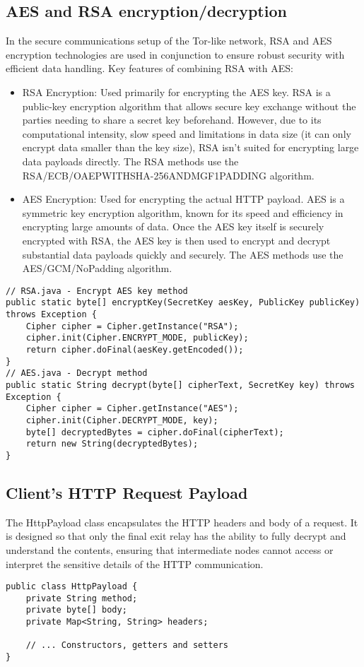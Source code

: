 \documentclass[sigconf]{acmart}
\begin{document}
\subsection{AES and RSA encryption/decryption}
In the secure communications setup of the Tor-like network, RSA and AES encryption technologies are used in conjunction to ensure robust security with efficient data handling.
Key features of combining RSA with AES:
\begin{itemize}
    \item RSA Encryption: Used primarily for encrypting the AES key. RSA is a public-key encryption algorithm that allows secure key exchange without the parties needing to share a secret key beforehand. However, due to its computational intensity, slow speed and limitations in data size (it can only encrypt data smaller than the key size), RSA isn't suited for encrypting large data payloads directly. The RSA methods use the RSA/ECB/OAEPWITHSHA-256ANDMGF1PADDING algorithm.
    \item AES Encryption: Used for encrypting the actual HTTP payload. AES is a symmetric key encryption algorithm, known for its speed and efficiency in encrypting large amounts of data. Once the AES key itself is securely encrypted with RSA, the AES key is then used to encrypt and decrypt substantial data payloads quickly and securely. The AES methods use the AES/GCM/NoPadding algorithm.
\end{itemize}

\begin{lstlisting}
// RSA.java - Encrypt AES key method
public static byte[] encryptKey(SecretKey aesKey, PublicKey publicKey) throws Exception {
    Cipher cipher = Cipher.getInstance("RSA");
    cipher.init(Cipher.ENCRYPT_MODE, publicKey);
    return cipher.doFinal(aesKey.getEncoded());
}
// AES.java - Decrypt method
public static String decrypt(byte[] cipherText, SecretKey key) throws Exception {
    Cipher cipher = Cipher.getInstance("AES");
    cipher.init(Cipher.DECRYPT_MODE, key);
    byte[] decryptedBytes = cipher.doFinal(cipherText);
    return new String(decryptedBytes);
}
\end{lstlisting}

\subsection{Client's HTTP Request Payload}
The HttpPayload class encapsulates the HTTP headers and body of a request. It is designed so that only the final exit relay has the ability to fully decrypt and understand the contents, ensuring that intermediate nodes cannot access or interpret the sensitive details of the HTTP communication.
\begin{lstlisting}
public class HttpPayload {
    private String method;
    private byte[] body;
    private Map<String, String> headers;

	// ... Constructors, getters and setters
}
\end{lstlisting}
\end{document}
